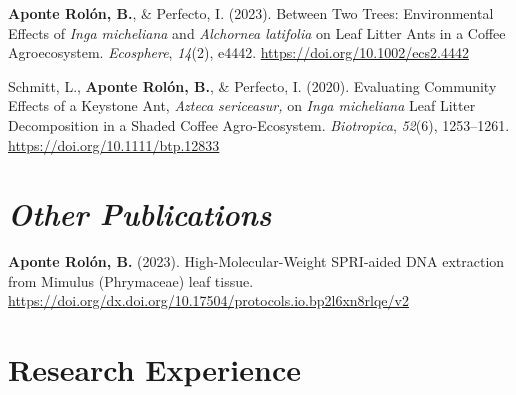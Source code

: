 \documentclass[11pt,a4paper,]{awesome-cv}
\begin{document}
\hypertarget{bibliography}{}
\leavevmode{}%
\textbf{Aponte Rolón, B.}, \& Perfecto, I. (2023). Between Two Trees:
Environmental Effects of \emph{Inga micheliana} and
\emph{Alchornea latifolia} on Leaf Litter Ants in a Coffee
Agroecosystem. \emph{Ecosphere}, \emph{14}(2), e4442.
\url{https://doi.org/10.1002/ecs2.4442}

\leavevmode{}%
Schmitt, L., \textbf{Aponte Rolón, B.}, \& Perfecto, I. (2020).
Evaluating Community Effects of a Keystone Ant,
\emph{Azteca sericeasur,} on \emph{Inga micheliana} Leaf Litter
Decomposition in a Shaded Coffee Agro-Ecosystem. \emph{Biotropica},
\emph{52}(6), 1253--1261. \url{https://doi.org/10.1111/btp.12833}

\hypertarget{other-publications}{%
\section{\texorpdfstring{ \emph{Other
Publications}}{ Other Publications}}\label{other-publications}}

\hypertarget{bibliography}{}
\leavevmode{}%
\textbf{Aponte Rolón, B.} (2023). High-Molecular-Weight SPRI-aided DNA
extraction from Mimulus (Phrymaceae) leaf tissue.
\url{https://doi.org/dx.doi.org/10.17504/protocols.io.bp2l6xn8rlqe/v2}

\hypertarget{research-experience}{%
\section{\texorpdfstring{ Research
Experience}{ Research Experience}}\label{research-experience}}
\end{document}

